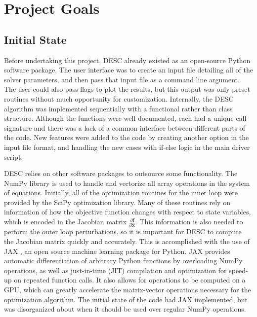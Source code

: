 \documentclass{article}
\begin{document}
\section{Project Goals}

\subsection{Initial State}

Before undertaking this project, DESC already existed as an open-source Python software package.
The user interface was to create an input file detailing all of the solver parameters, and then pass that input file as a command line argument.
The user could also pass flags to plot the results, but this output was only preset routines without much opportunity for customization.
Internally, the DESC algorithm was implemented sequentially with a functional rather than class structure.
Although the functions were well documented, each had a unique call signature and there was a lack of a common interface between different parts of the code.
New features were added to the code by creating another option in the input file format, and handling the new cases with if-else logic in the main driver script.

DESC relies on other software packages to outsource some functionality.
The NumPy \cite{NumPy} library is used to handle and vectorize all array operations in the system of equations.
Initially, all of the optimization routines for the inner loop were provided by the SciPy \cite{SciPy} optimization library.
Many of these routines rely on information of how the objective function changes with respect to state variables, which is encoded in the Jacobian matrix $\frac{\partial\mathbf{f}}{\partial\mathbf{x}}$.
This information is also needed to perform the outer loop perturbations, so it is important for DESC to compute the Jacobian matrix quickly and accurately.
This is accomplished with the use of JAX \cite{JAX}, an open source machine learning package for Python.
JAX provides automatic differentiation of arbitrary Python functions by overloading NumPy operations, as well as just-in-time (JIT) compilation and optimization for speed-up on repeated function calls.
It also allows for operations to be computed on a GPU, which can greatly accelerate the matrix-vector operations necessary for the optimization algorithm.
The initial state of the code had JAX implemented, but was disorganized about when it should be used over regular NumPy operations.
\end{document}
